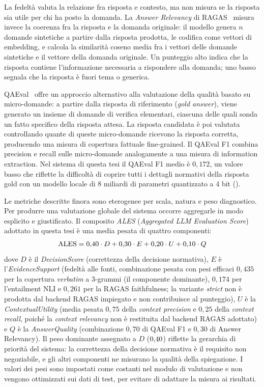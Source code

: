 La fedeltà valuta la relazione fra risposta e contesto, ma non misura se
la risposta sia utile per chi ha posto la domanda. La \emph{Answer Relevancy}
di RAGAS~\cite{ragas2024} misura invece la coerenza fra la risposta e la
domanda originale: il modello genera $n$ domande sintetiche a partire dalla
risposta prodotta, le codifica come vettori di embedding, e calcola la
similarità coseno media fra i vettori delle domande sintetiche e il vettore
della domanda originale. Un punteggio alto indica che la risposta contiene
l'informazione necessaria a rispondere alla domanda; uno basso segnala
che la risposta è fuori tema o generica.

QAEval~\cite{deutsch2021qaeval} offre un approccio alternativo alla valutazione
della qualità basato su micro-domande: a partire dalla risposta di
riferimento (\emph{gold answer}), viene generato un insieme di domande
di verifica elementari, ciascuna delle quali sonda un fatto specifico
della risposta attesa. La risposta candidata è poi valutata controllando
quante di queste micro-domande ricevono la risposta corretta, producendo
una misura di copertura fattuale fine-grained. Il QAEval F1 combina
precision e recall sulle micro-domande analogamente a una misura di
information extraction. Nel sistema di questa tesi il QAEval F1 medio
è $0{,}172$, un valore basso che riflette la difficoltà di coprire
tutti i dettagli normativi della risposta gold con un modello locale di
8 miliardi di parametri quantizzato a 4 bit (\llmmodel).

Le metriche descritte finora sono eterogenee per scala, natura e peso
diagnostico. Per produrre una valutazione globale del sistema occorre
aggregarle in modo esplicito e giustificato. Il composito \emph{ALES}
(\emph{Aggregated LLM Evaluation Score}) adottato in questa tesi è una
media pesata di quattro componenti:
\[
  \text{ALES} = 0{,}40 \cdot D + 0{,}30 \cdot E + 0{,}20 \cdot U + 0{,}10 \cdot Q
\]
dove $D$ è il \emph{DecisionScore} (correttezza della decisione normativa),
$E$ è l'\emph{EvidenceSupport} (fedeltà alle fonti, combinazione pesata con pesi
efficaci $0{,}435$ per la copertura \emph{verbatim} a 3-grammi (il componente
dominante), $0{,}174$ per l'entailment NLI e $0{,}261$ per la RAGAS
faithfulness; la variante \emph{strict} non è prodotta dal backend RAGAS
impiegato e non contribuisce al punteggio), $U$ è la \emph{ContextualUtility}
(media pesata $0{,}75$ della \emph{context precision} e $0{,}25$ della
\emph{context recall}, poiché la \emph{context relevancy} non è restituita dal
backend RAGAS adottato) e $Q$ è la \emph{AnswerQuality} (combinazione $0{,}70$ di
QAEval F1 e $0{,}30$ di Answer Relevancy). Il peso dominante assegnato a $D$ ($0{,}40$) riflette
la gerarchia di priorità del sistema: la correttezza della decisione normativa
è il requisito non negoziabile, e gli altri componenti ne misurano la
qualità della spiegazione. I valori dei pesi sono impostati come costanti nel
modulo di valutazione e non vengono ottimizzati sui dati di test, per evitare
di adattare la misura ai risultati.

